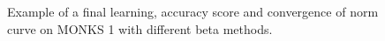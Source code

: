 \begin{appendices}
\begin{figure}[H]
\begin{subfigure}{0.4\textwidth}
                \end{subfigure}
                \begin{subfigure}{0.4\textwidth}
                    \caption{}
                    \label{fig:monks_1_NORM_CGD}
                \end{subfigure}
                \caption{Example of a final learning, accuracy score and convergence of norm curve on MONKS 1 with different beta methods.}
                \label{fig:monks_1_CGD}
            \end{figure}


\end{appendices}
